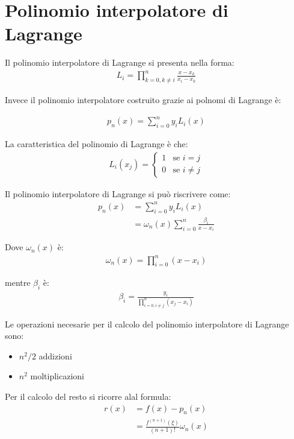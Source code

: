 \chapter{Polinomio interpolatore di Lagrange}

Il polinomio interpolatore di Lagrange si presenta nella forma:
\begin{align}
  L_i = \prod_{k=0, k\neq i}^n \frac{x - x_k}{x_i - x_k}
\end{align}

Invece il polinomio interpolatore costruito grazie ai polnomi di Lagrange è:

\begin{align}
  p_n(x) = \sum_{i=0}^n y_i L_i(x)
\end{align}

La caratteristica del polinomio di Lagrange è che:
\begin{align}
  L_i(x_j) = \begin{cases}
    1 & \text{se } i = j \\
    0 & \text{se } i \neq j
  \end{cases}
\end{align}

Il polinomio interpolatore di Lagrange si può riscrivere come:
\begin{align}
  p_n(x)  &= \sum_{i=0}^n y_i L_i(x) \\
          &= \omega_n(x) \sum_{i = 0}^n \frac{\beta_i}{x-x_i}
\end{align}

Dove $\omega_n(x)$ è:
\begin{align}
  \omega_n(x) = \prod_{i=0}^n (x-x_i)
\end{align}


mentre $\beta_i$ è:
\begin{align}
  \beta_i = \frac{y_i}{\prod_{i=0, i\neq j}^n (x_j - x_i)}
\end{align}

Le operazioni necesarie per il calcolo del polinomio interpolatore di Lagrange sono:

\begin{itemize}
  \item $n^2/2$ addizioni
  \item $n^2$ moltiplicazioni
\end{itemize}

Per il calcolo del resto si ricorre alal formula:
\begin{align}
  r(x) &= f(x) - p_n(x) \\
        &= \frac{f^{(n+1)}(\xi)}{(n+1)!} \omega_n(x)
\end{align}
